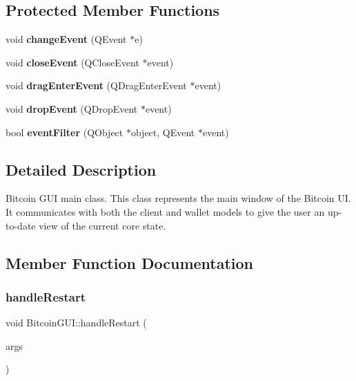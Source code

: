 \subsection*{Protected Member Functions}
\begin{DoxyCompactItemize}
\item 
\mbox{\label{class_bitcoin_g_u_i_a11e94d1243e51b6398e7ca4079f7c46a}} 
void {\bfseries change\+Event} (Q\+Event $\ast$e)
\item 
\mbox{\label{class_bitcoin_g_u_i_ac46f8826c13b6340f5568d3f31fc3dfa}} 
void {\bfseries close\+Event} (Q\+Close\+Event $\ast$event)
\item 
\mbox{\label{class_bitcoin_g_u_i_a8c241174b5b109c2b27019bad289e34d}} 
void {\bfseries drag\+Enter\+Event} (Q\+Drag\+Enter\+Event $\ast$event)
\item 
\mbox{\label{class_bitcoin_g_u_i_a1faa00034444ca5930f0751b86646b68}} 
void {\bfseries drop\+Event} (Q\+Drop\+Event $\ast$event)
\item 
\mbox{\label{class_bitcoin_g_u_i_aeee2453bf1a3fb39bb22757e21f676d4}} 
bool {\bfseries event\+Filter} (Q\+Object $\ast$object, Q\+Event $\ast$event)
\end{DoxyCompactItemize}


\subsection{Detailed Description}
Bitcoin G\+UI main class. This class represents the main window of the Bitcoin UI. It communicates with both the client and wallet models to give the user an up-\/to-\/date view of the current core state. 

\subsection{Member Function Documentation}
\mbox{\label{class_bitcoin_g_u_i_a0f9d1262e45413fa51a395d41f615917}} 
\subsubsection{\texorpdfstring{handle\+Restart}{handleRestart}}
{\footnotesize\ttfamily void Bitcoin\+G\+U\+I\+::handle\+Restart (\begin{DoxyParamCaption}\item[{Q\+String\+List}]{args }\end{DoxyParamCaption})\hspace{0.3cm}{\ttfamily [slot]}}

